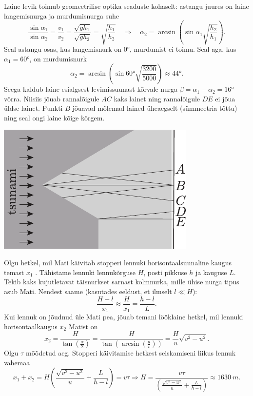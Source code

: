 \documentclass[10pt]{article}
\begin{document}
{%

\solu
Laine levik toimub geomeetrilise optika seaduste kohaselt: astangu juures on laine langemisnurga ja murdumisnurga suhe
\[
\frac{\sin \alpha_{1}}{\sin \alpha_{2}}=\frac{v_{1}}{v_{2}}=\frac{\sqrt{g h_{1}}}{\sqrt{g h_{2}}}=\sqrt{\frac{h_{1}}{h_{2}}} \quad\Rightarrow\quad \alpha_{2}=\arcsin \left(\sin \alpha_{1} \sqrt{\frac{h_{2}}{h_{1}}}\right).
\]
Seal astangu osas, kus langemisnurk on \ang{0}, murdumist ei toimu. Seal aga, kus $\alpha_1 = \ang{60}$, on murdumisnurk
\[
\alpha_{2}=\arcsin \left(\sin \ang{60} \sqrt{\frac{3200}{5000}}\right) \approx \ang{44}.
\]
Seega kaldub laine esialgsest levimissuunast kõrvale nurga $\beta = \alpha_1 -\alpha_2 = \ang{16}$ võrra. Niisiis jõuab rannalõigule $AC$ kaks lainet ning rannalõigule $DE$ ei jõua üldse lainet. Punkti $B$ jõuavad mõlemad lained üheaegselt (sümmeetria tõttu) ning seal ongi laine kõige kõrgem.

\begin{center}
	\includegraphics[width=0.6\linewidth]{2005-v3g-06-lah}
\end{center}
\probend
\bigskip


\solu
Olgu hetkel, mil Mati käivitab stopperi lennuki horisontaalsuunaline kaugus
temast $x_{1}$ . Tähistame lennuki lennukõrguse $H$, posti pikkuse $h$ ja
kauguse
$L$. Tekib kaks kujutletavat täisnurkset sarnast kolmnurka, mille ühise nurga
tipus asub Mati. Nendest saame (kasutades eeldust, et ilmselt $l\ll H$):
\[\frac{H-l}{x_{1}}\approx\frac{H}{x_{1}}=\frac{h-l}{L}. \]
Kui lennuk on jõudnud üle Mati pea, jõuab temani lööklaine hetkel, mil lennuki horisontaalkaugus $x_{2}$ Matist on
\[ x_{2}=\frac{H}{\tan\left(\frac{\alpha}{2}\right)}=\frac{H}{\tan\left(\arcsin\left(\frac{u}{v}\right)\right)}=\frac{H}{u}\sqrt{v^2-u^2}.
\]
Olgu $\tau$ mõõdetud aeg. Stopperi käivitamise hetkest seiskamiseni liikus lennuk vahemaa
\[ x_1+x_2=H\left(\frac{\sqrt{v^2-u^2}}{u} +\frac{L}{h-l}\right)=v\tau
\Rightarrow
H=\frac{v\tau}{\left(\frac{\sqrt{v^2-u^2}}{u} +\frac{L}{h-l}\right)}\approx
\SI{1630}{m}.
\]
\probend
\bigskip

}
\end{document}
